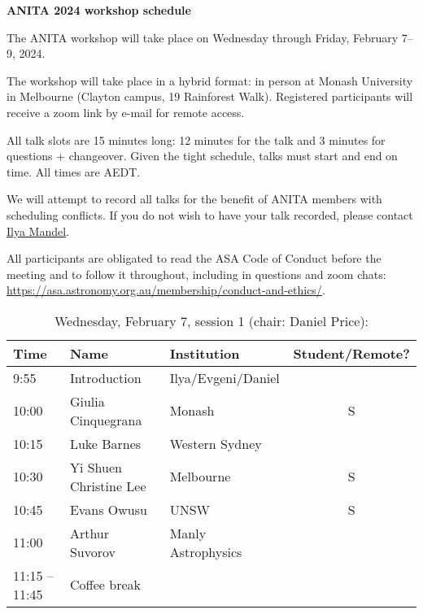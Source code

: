 \documentclass[amsmath,onecolumn]{revtex4-1}
\begin{document}
\begin{center}
{\bf ANITA 2024 workshop schedule}\\
\end{center}
\vspace{0.2in}

The ANITA workshop will take place on Wednesday through Friday, February 7--9, 2024.

The workshop will take place in a hybrid format: in person at Monash University in Melbourne (Clayton campus, 19 Rainforest Walk).  Registered participants will receive a zoom link by e-mail for remote access.  


All talk slots are 15 minutes long: 12 minutes for the talk and 3 minutes for questions + changeover.  Given the tight schedule, talks must start and end on time.  All times are AEDT.


We will attempt to record all talks for the benefit of ANITA members with scheduling conflicts.  If you do not wish to have your talk recorded, please contact \href{mailto:ilya.mandel@monash.edu}{Ilya Mandel}.

All participants are obligated to read the ASA Code of Conduct before the meeting and to follow it throughout, including in questions and zoom chats:
\url{https://asa.astronomy.org.au/membership/conduct-and-ethics/}.


\FloatBarrier

\begin{table}[!htbp]
	\centering
	\caption{Wednesday, February 7, session 1 (chair: Daniel Price):}
\begin{tabular}{| l | l | l | c |}
	\hline
	Time & Name  & Institution & Student/Remote? \\ 		
	\hline
	9:55 & Introduction & Ilya/Evgeni/Daniel & \\
	\hline
	10:00 & Giulia	Cinquegrana & Monash & S\\
	10:15 & 	Luke	Barnes & Western Sydney & \\
	10:30 & Yi Shuen Christine	Lee & Melbourne&  S\\
	10:45 & Evans	Owusu & UNSW & S \\
	11:00 & Arthur	Suvorov & Manly Astrophysics & \\
	\hline
	11:15 -- 11:45 & Coffee break & & \\
	\hline
\end{tabular}
\end{table}
\end{document}
